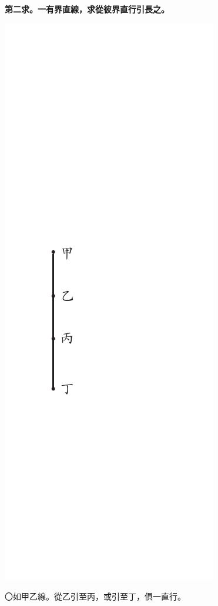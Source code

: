 \documentclass[12pt,b5paper,landscape]{article}
\newcommand{\bcom}[1]{〇#1}
\newcommand{\cthm}[1]{{
\vspace{8pt}

\bfseries #1}}
\begin{document}
\begin{multicols}{2}
\cthm{第二求。一有界直線，求從彼界直行引長之。}
\begin{center}
\includegraphics[angle=90]{eu27}
\end{center}
\bcom{如甲乙線。從乙引至丙，或引至丁，俱一直行。}


\end{multicols}
\end{document}
